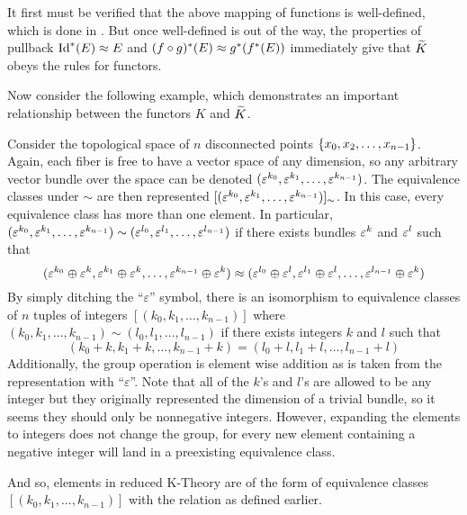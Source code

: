 \documentclass[../sean_thesis.tex]{subfiles}
\begin{document}

It first must be verified that the above mapping of functions is well-defined, which is done in . But once well-defined is out of the way, the properties of pullback $\operatorname{Id}^{*}(E) \approx E$ and $(f\circ g)^{*}(E) \approx g^{*}(f^{*}(E))$ immediately give that $\widetilde{K}$ obeys the rules for functors.

Now consider the following example, which demonstrates an important relationship between the functors $K$ and $\widetilde{K}$.
\begin{example}
\label{ex:kr_n_points}
	Consider the topological space of $n$ disconnected points $\left\{x_0, x_2, \dots, x_{n-1}\right\}$. Again, each fiber is free to have a vector space of any dimension, so any arbitrary vector bundle over the space can be denoted $(\varepsilon^{k_0}, \varepsilon^{k_1}, \dots, \varepsilon^{k_{n-1}})$. The equivalence classes under $\sim$ are then represented $[(\varepsilon^{k_0}, \varepsilon^{k_1}, \dots, \varepsilon^{k_{n-1}})]_{\sim}$. In this case, every equivalence class has more than one element. In particular, $(\varepsilon^{k_0}, \varepsilon^{k_1}, \dots, \varepsilon^{k_{n-1}}) \sim (\varepsilon^{l_0}, \varepsilon^{l_1}, \dots, \varepsilon^{l_{n-1}})$ if there exists bundles $\varepsilon^{k}$ and $\varepsilon^{l}$ such that 
	\begin{equation*}
		(\varepsilon^{k_0} \oplus \varepsilon^{k}, \varepsilon^{k_1} \oplus \varepsilon^{k}, \dots, \varepsilon^{k_{n-1}} \oplus \varepsilon^{k})
		\approx
		(\varepsilon^{l_0} \oplus \varepsilon^{l}, \varepsilon^{l_1} \oplus \varepsilon^{l}, \dots, \varepsilon^{l_{n-1}} \oplus \varepsilon^{k})
	\end{equation*}
By simply ditching the ``$\varepsilon$'' symbol, there is an isomorphism to equivalence classes of $n$ tuples of integers $[(k_0, k_1, \dots, k_{n-1})]$ where $(k_0, k_1, \dots, k_{n-1}) \sim (l_0, l_1, \dots, l_{n-1})$ if there exists integers $k$ and $l$ such that
\begin{equation*}
	(k_0 + k, k_1 + k, \dots, k_{n-1} + k) = (l_0 + l, l_1 + l, \dots, l_{n-1} + l)
\end{equation*}
Additionally, the group operation is element wise addition as is taken from the representation with ``$\varepsilon$''. Note that all of the $k$'s and $l$'s are allowed to be any integer but they originally represented the dimension of a trivial bundle, so it seems they should only be nonnegative integers. However, expanding the elements to integers does not change the group, for every new element containing a negative integer will land in a preexisting equivalence class.

And so, elements in reduced K-Theory are of the form of equivalence classes $[(k_0, k_1, \dots, k_{n-1})]$ with the  relation as defined earlier.


\end{example}
\end{document}
